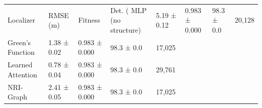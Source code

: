 \begin{tabular}{lllll}
\toprule
Localizer & RMSE (m) & Fitness & Det. (%
\midrule
MLP (no structure) & 5.19 ± 0.12 & 0.983 ± 0.000 & 98.3 ± 0.0 & 20,128 \\
Green's Function & 1.38 ± 0.02 & 0.983 ± 0.000 & 98.3 ± 0.0 & 17,025 \\
Learned Attention & 0.78 ± 0.04 & 0.983 ± 0.000 & 98.3 ± 0.0 & 29,761 \\
NRI-Graph & 2.41 ± 0.05 & 0.983 ± 0.000 & 98.3 ± 0.0 & 17,025 \\
\bottomrule
\end{tabular}
